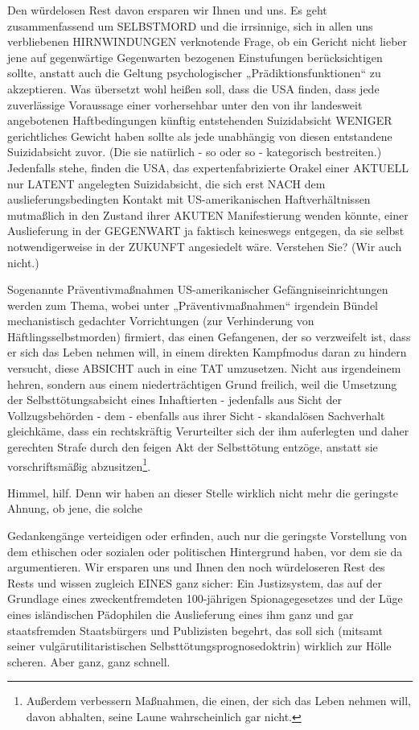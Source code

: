 \begin{multicols}{2}
Den würdelosen Rest davon ersparen wir Ihnen und
uns. Es geht zusammenfassend um SELBSTMORD und
die irrsinnige, sich in allen uns verbliebenen HIRNWINDUNGEN verknotende Frage, ob ein Gericht nicht lieber
jene auf gegenwärtige Gegenwarten bezogenen Einstufungen berücksichtigen sollte, anstatt auch die Geltung
psychologischer „Prädiktionsfunktionen“ zu akzeptieren. Was übersetzt wohl heißen soll, dass die USA finden,
dass jede zuverlässige Voraussage einer vorhersehbar
unter den von ihr landesweit angebotenen Haftbedingungen künftig entstehenden Suizidabsicht WENIGER
gerichtliches Gewicht haben sollte als jede unabhängig
von diesen entstandene Suizidabsicht zuvor. (Die sie natürlich - so oder so - kategorisch bestreiten.) Jedenfalls
stehe, finden die USA, das expertenfabrizierte Orakel
einer AKTUELL nur LATENT angelegten Suizidabsicht,
die sich erst NACH dem auslieferungsbedingten Kontakt
mit US-amerikanischen Haftverhältnissen mutmaßlich
in den Zustand ihrer AKUTEN Manifestierung wenden
könnte, einer Auslieferung in der GEGENWART ja faktisch keineswegs entgegen, da sie selbst notwendigerweise in der ZUKUNFT angesiedelt wäre. Verstehen Sie?
(Wir auch nicht.)

Sogenannte Präventivmaßnahmen US-amerikanischer
Gefängniseinrichtungen werden zum Thema, wobei unter „Präventivmaßnahmen“ irgendein Bündel mechanistisch gedachter Vorrichtungen (zur Verhinderung von
Häftlingsselbstmorden) firmiert, das einen Gefangenen,
der so verzweifelt ist, dass er sich das Leben nehmen
will, in einem direkten Kampfmodus daran zu hindern
versucht, diese ABSICHT auch in eine TAT umzusetzen.
Nicht aus irgendeinem hehren, sondern aus einem niederträchtigen Grund freilich, weil die Umsetzung der
Selbsttötungsabsicht eines Inhaftierten - jedenfalls aus
Sicht der Vollzugsbehörden - dem - ebenfalls aus ihrer
Sicht - skandalösen Sachverhalt gleichkäme, dass ein
rechtskräftig Verurteilter sich der ihm auferlegten und
daher gerechten Strafe durch den feigen Akt der Selbsttötung entzöge, anstatt sie vorschriftsmäßig 
abzusitzen\footnote[21]{Außerdem verbessern Maßnahmen, die einen, der sich das Leben nehmen will, davon abhalten, seine Laune wahrscheinlich gar nicht.}.

Himmel, hilf. Denn wir haben an dieser Stelle wirklich
nicht mehr die geringste Ahnung, ob jene, die solche

Gedankengänge verteidigen oder erfinden, auch nur
die geringste Vorstellung von dem ethischen oder sozialen oder politischen Hintergrund haben, vor dem sie da
argumentieren. Wir ersparen uns und Ihnen den noch
würdeloseren Rest des Rests und wissen zugleich EINES
ganz sicher: Ein Justizsystem, das auf der Grundlage eines zweckentfremdeten 100-jährigen Spionagegesetzes
und der Lüge eines isländischen Pädophilen die Auslieferung eines ihm ganz und gar staatsfremden Staatsbürgers und Publizisten begehrt, das soll sich (mitsamt
seiner vulgärutilitaristischen Selbsttötungsprognosedoktrin) wirklich zur Hölle scheren. Aber ganz, ganz
schnell.


\end{multicols}
